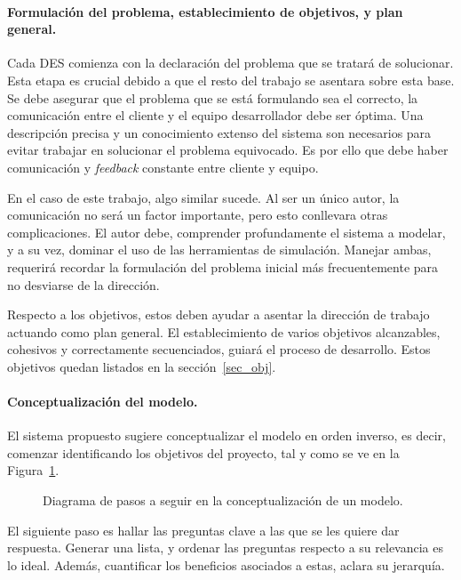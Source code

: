 \paragraph{Formulación del problema, establecimiento de objetivos, y plan general.}

Cada DES comienza con la declaración del problema que se tratará de solucionar.
Esta etapa es crucial debido a que el resto del
trabajo se asentara sobre esta base.
Se debe asegurar que el problema que se está formulando sea el correcto,
la comunicación entre el cliente y el equipo desarrollador debe ser óptima.
Una descripción precisa y un conocimiento extenso del sistema son necesarios para evitar
trabajar en solucionar el problema equivocado.
Es por ello que debe haber comunicación y \textit{feedback}
constante entre cliente y equipo.

En el caso de este trabajo, algo similar sucede.
Al ser un único autor, la comunicación no será un factor importante,
pero esto conllevara otras complicaciones.
El autor debe, comprender profundamente el sistema a modelar, y a su vez,
dominar el uso de las herramientas de simulación.
Manejar ambas, requerirá recordar la formulación del problema inicial
más frecuentemente para no desviarse de la dirección.

Respecto a los objetivos, estos deben ayudar a
asentar la dirección de trabajo actuando como plan general.
El establecimiento de varios objetivos alcanzables,
cohesivos y correctamente secuenciados,
guiará el proceso de desarrollo.
Estos objetivos quedan listados en la sección~\ref{sec_obj}.

\paragraph{Conceptualización del modelo.}\label{sec:modelconcept}

El sistema propuesto sugiere conceptualizar el modelo en orden inverso,
es decir, comenzar identificando los objetivos del proyecto,
tal y como se ve en la Figura~\ref{fig:2_fc_model_concept}.

\begin{figure}[h]
	\begin{center}
		
	\end{center}
	\caption{Diagrama de pasos a seguir en la conceptualización de un modelo.}
	\label{fig:2_fc_model_concept}
\end{figure}

El siguiente paso es hallar las preguntas clave a las que
se les quiere dar respuesta.
Generar una lista, y ordenar las preguntas respecto a su relevancia es lo ideal.
Además, cuantificar los beneficios asociados a estas, aclara su jerarquía.

